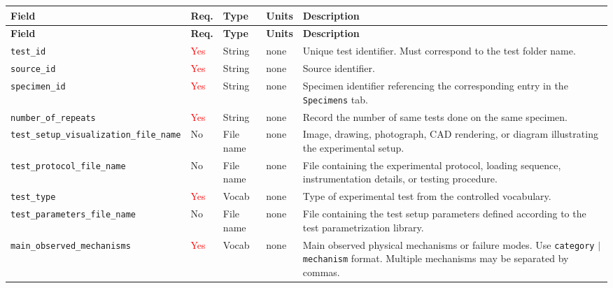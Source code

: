 \documentclass[11pt]{book}
\begin{document}
\small
\begin{longtable}{>{\raggedright\arraybackslash}p{}
                  >{\centering\arraybackslash}p{}
                  >{\raggedright\arraybackslash}p{}
                  >{\centering\arraybackslash}p{}
                  >{\raggedright\arraybackslash}p{}}
\hline
\textbf{Field} &
\textbf{Req.} &
\textbf{Type} &
\textbf{Units} &
\textbf{Description} \\
\hline
\endfirsthead

\hline
\textbf{Field} &
\textbf{Req.} &
\textbf{Type} &
\textbf{Units} &
\textbf{Description} \\
\hline
\endhead

\texttt{test\_id} & \textcolor{red}{Yes} & String & none & Unique test identifier. Must correspond to the test folder name. \\

\texttt{source\_id} & \textcolor{red}{Yes} & String & none & Source identifier. \\

\texttt{specimen\_id} & \textcolor{red}{Yes} & String & none & Specimen identifier referencing the corresponding entry in the \texttt{Specimens} tab. \\

\texttt{number\_of\_repeats} & \textcolor{red}{Yes} & String & none &  Record the number of same tests done on the same specimen.\\

\texttt{test\_setup\_visualization\_file\_name} & No & File name & none & Image, drawing, photograph, CAD rendering, or diagram illustrating the experimental setup. \\

\texttt{test\_protocol\_file\_name} & No & File name & none & File containing the experimental protocol, loading sequence, instrumentation details, or testing procedure. \\

\texttt{test\_type} & \textcolor{red}{Yes} & Vocab & none & Type of experimental test from the controlled vocabulary. \\

\texttt{test\_parameters\_file\_name} & No & File name & none & File containing the test setup parameters defined according to the test parametrization library. \\

\texttt{main\_observed\_mechanisms} & \textcolor{red}{Yes} & Vocab & none & Main observed physical mechanisms or failure modes. Use \texttt{category} $|$ \texttt{mechanism} format. Multiple mechanisms may be separated by commas. \\


\end{longtable}
\end{document}

